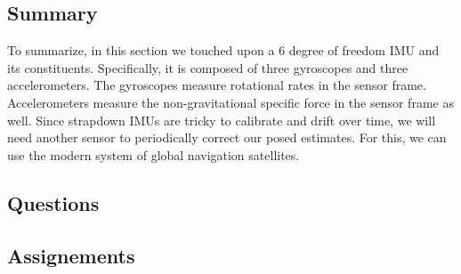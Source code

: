 \subsection{Summary}

To summarize, in this section we touched upon a 6 degree of freedom IMU and its constituents. Specifically, it is composed of three gyroscopes and
three accelerometers. The gyroscopes measure rotational rates in the sensor frame. Accelerometers measure
the non-gravitational specific force in the sensor frame as well. Since strapdown IMUs are tricky
to calibrate and drift over time, we will need another sensor to periodically
correct our posed estimates. For this, we can use the modern system
of global navigation satellites. 

\subsection{Questions}

\subsection{Assignements}
